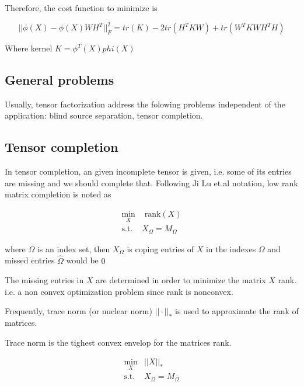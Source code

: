 \documentclass[letterpaper,12pt]{article}
\begin{document}
Therefore, the cost function to minimize is

\begin{equation}
 || \phi(X) - \phi(X)WH^T ||_F^2 = tr(K) - 2 tr(H^TKW)+tr(W^TKWH^TH)
\end{equation}

 Where kernel $K=\phi^T(X)phi(X)$
 
 

\subsection{General problems}

 Usually, tensor factorization address the folowing problems independent of the application: blind source separation, tensor completion.

 \subsection{Tensor completion}
 
 In tensor completion, an given incomplete tensor is given, i.e. some of its entries are missing and we should complete that. Following Ji Lu et.al \cite{Liu2013} notation,  low rank matrix completion is noted as

\begin{equation} 
 \begin{split}
  \min_X & \text{ rank}(X)\\
  \text{s.t. } & X_\Omega = M_\Omega
 \end{split}
\end{equation}

where $\Omega$ is an index set, then $X_\Omega$ is coping entries of $X$ in the indexes $\Omega$ and missed entries $\hat{\Omega}$ would be $0$

The missing entries in $X$ are determined in order to minimize the matrix $X$ rank. i.e. a non convex optimization problem since rank is nonconvex.

Frequently, trace norm (or nuclear norm) $||\cdot ||_*$ is used to approximate the rank of matrices.

Trace norm is the tighest convex envelop for the matrices rank.

\begin{equation} 
 \begin{split}
  \min_X & ||X||_*\\
  \text{s.t. } & X_\Omega = M_\Omega
 \end{split}
\end{equation}
\end{document}
